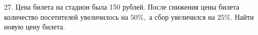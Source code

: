 27. Цена билета на стадион была 150 рублей. После снижения цены билета количество посетителей увеличилось на $50\%,$ а сбор увеличился на $25\%.$ Найти новую цену билета.\\
